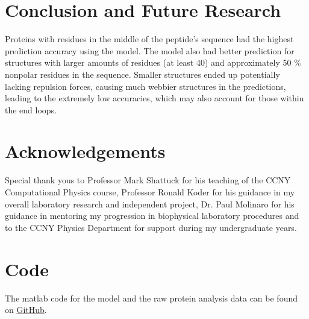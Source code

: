 \documentclass[aps,prl,reprint]{revtex4-2}
\begin{document}
\section{Conclusion and Future Research}
Proteins with residues in the middle of the peptide's sequence had the highest prediction accuracy using the model. The model also had better prediction for structures with larger amounts of residues (at least 40) and approximately 50 $\%$ nonpolar residues in the sequence. Smaller structures ended up potentially lacking repulsion forces, causing much webbier structures in the predictions, leading to the extremely low accuracies, which may also account for those within the end loops.

\section{Acknowledgements}
Special thank yous to Professor Mark Shattuck for his teaching of the CCNY Computational Physics course, Professor Ronald Koder for his guidance in my overall laboratory research and independent project, Dr. Paul Molinaro for his guidance in mentoring my progression in biophysical laboratory procedures and to the CCNY Physics Department for support during my undergraduate years.

\section{Code}
The matlab code for the model and the raw protein analysis data can be found on \href{https://github.com/marloonles/computationalphysics}{GitHub}.
\end{document}
